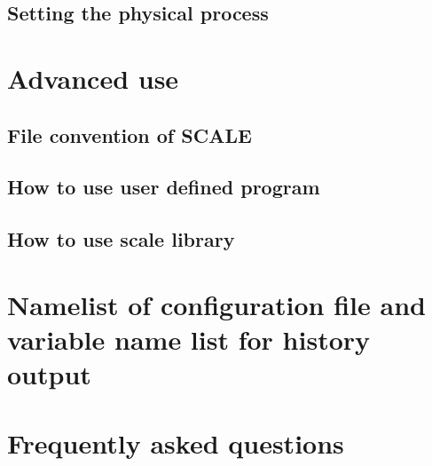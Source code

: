 \documentclass[a4paper]{report}
\begin{document}
 \section{Setting the physical process} \label{sec:basic_usel_physics}

\chapter{Advanced use} \label{chap:advance_use}
 \section{File convention of SCALE}
 \section{How to use user defined program}
 \section{How to use scale library}





\begin{appendix}
\chapter{Namelist of configuration file and variable name list for history output} \label{achap:namelist}

\chapter{Frequently asked questions} \label{achap:practice}


\end{appendix}


\ClearWallPaper

\end{document}
